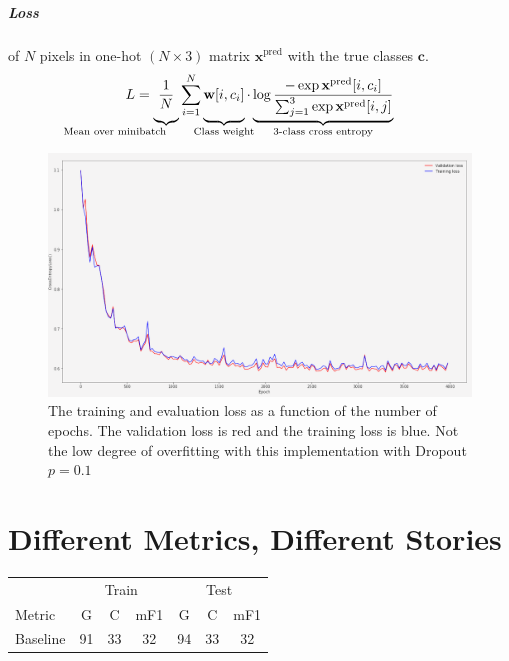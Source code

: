 \documentclass[
    ,title     = {{Image Segmentation for Smart Agriculture}}
    ,subject   = {{This is the subject of my work}}
    ,papersize = {{a1paper}}
    ,nocrop
]{dtuposter}
\begin{document}
\begin{dtupostercontent}
\subparagraph{Loss} of \(N\) pixels in one-hot \((N \times  3)\) matrix \(\mathbf x^\text{pred}\) with the true classes \(\mathbf c\).
\[
L = \underbrace{
\vphantom{\sum_{i}}
\frac 1 N}
_{\mathllap{\text{Mean over minibatch}}}
\sum_{\mathclap {i=1}}^{N}
\underbrace{ 
\vphantom{\sum_{i}}
\mathbf{w}[i, c_i]}
_{\mathclap{\text{Class weight}}}  
\cdot 
\underbrace{
\log 
\frac
{-\exp\mathbf x^\text{pred}[i, c_i]}
{\sum_{j=1}^{3}\exp\mathbf x^\text{pred}[i, j]}
}_{\mathclap{\text{3-class cross entropy}}}
\]
\begin{figure}
	\begin{center}
			\includegraphics[width=\linewidth,origin=c]{loss2}
	\end{center}
	\caption{The training and evaluation loss as a function of the number of epochs. The validation loss is red and the training loss is blue. Not the low degree of overfitting with this implementation with Dropout \(p=0.1\)}\label{fig:example2}
\end{figure}



\section{Different Metrics, Different Stories}


\begin{table}
	\centering 
	\begin{tabular}{l|ccc|ccc|}
		
		\rule[-1ex]{0pt}{2.5ex}  & \multicolumn{3}{c|}{Train} &  \multicolumn{3}{c|}{Test} \\ 
		
		\rule[-1ex]{0pt}{2.5ex} Metric  & G & C &  mF1 & G & C &  mF1 \\ 
		\hline
		\rule[-1ex]{0pt}{2.5ex} Baseline& 91& 33   &32  &94  &33  &32  \\ 
		

\end{tabular}
\end{table}
\end{dtupostercontent}
\end{document}
